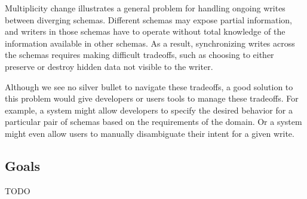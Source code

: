 \documentclass[english,submission]{programming}
\begin{document}
Multiplicity change illustrates a general problem for handling ongoing writes between diverging schemas. Different schemas may expose partial information, and writers in those schemas have to operate without total knowledge of the information available in other schemas. As a result, synchronizing writes across the schemas requires making difficult tradeoffs, such as choosing to either preserve or destroy hidden data not visible to the writer.

Although we see no silver bullet to navigate these tradeoffs, a good solution to this problem would give developers or users tools to manage these tradeoffs. For example, a system might allow developers to specify the desired behavior for a particular pair of schemas based on the requirements of the domain. Or a system might even allow users to manually disambiguate their intent for a given write.

\subsection{Goals}

TODO

\end{document}
